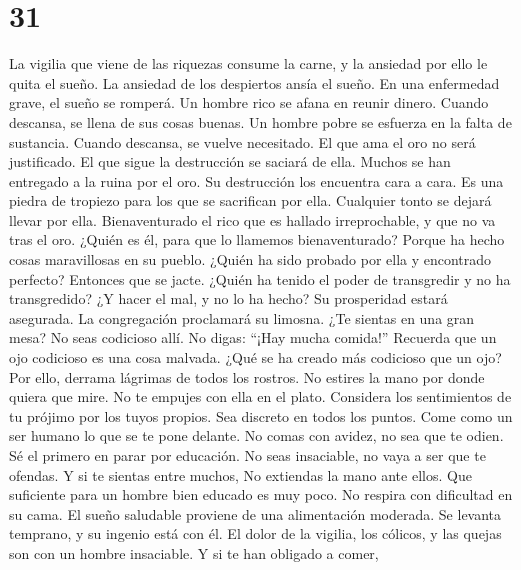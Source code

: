\hypertarget{section-30}{%
\section{31}\label{section-30}}

 La vigilia que viene de las riquezas consume la carne, y
la ansiedad por ello le quita el sueño.  La ansiedad de
los despiertos ansía el sueño. En una enfermedad grave, el sueño se
romperá.  Un hombre rico se afana en reunir dinero. Cuando
descansa, se llena de sus cosas buenas.  Un hombre pobre
se esfuerza en la falta de sustancia. Cuando descansa, se vuelve
necesitado.  El que ama el oro no será justificado. El que
sigue la destrucción se saciará de ella.  Muchos se han
entregado a la ruina por el oro. Su destrucción los encuentra cara a
cara.  Es una piedra de tropiezo para los que se
sacrifican por ella. Cualquier tonto se dejará llevar por ella.
 Bienaventurado el rico que es hallado irreprochable, y
que no va tras el oro.  ¿Quién es él, para que lo llamemos
bienaventurado? Porque ha hecho cosas maravillosas en su pueblo.
 ¿Quién ha sido probado por ella y encontrado perfecto?
Entonces que se jacte. ¿Quién ha tenido el poder de transgredir y no ha
transgredido? ¿Y hacer el mal, y no lo ha hecho?  Su
prosperidad estará asegurada. La congregación proclamará su limosna.
 ¿Te sientas en una gran mesa? No seas codicioso allí. No
digas: ``¡Hay mucha comida!''  Recuerda que un ojo
codicioso es una cosa malvada. ¿Qué se ha creado más codicioso que un
ojo? Por ello, derrama lágrimas de todos los rostros.  No
estires la mano por donde quiera que mire. No te empujes con ella en el
plato.  Considera los sentimientos de tu prójimo por los
tuyos propios. Sea discreto en todos los puntos.  Come
como un ser humano lo que se te pone delante. No comas con avidez, no
sea que te odien.  Sé el primero en parar por educación.
No seas insaciable, no vaya a ser que te ofendas.  Y si
te sientas entre muchos, No extiendas la mano ante ellos.
 Que suficiente para un hombre bien educado es muy poco.
No respira con dificultad en su cama.  El sueño saludable
proviene de una alimentación moderada. Se levanta temprano, y su ingenio
está con él. El dolor de la vigilia, los cólicos, y las quejas son con
un hombre insaciable.  Y si te han obligado a comer,
